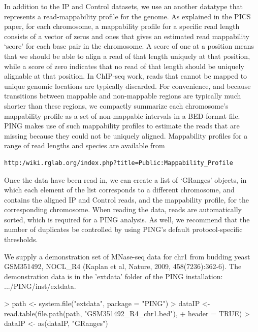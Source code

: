 \documentclass[11pt]{article}
\begin{document}
In addition to the IP and Control datasets, we use an another datatype that represents a read-mappability profile for the genome. 
As explained in the PICS paper, for each chromosome, a mappability profile for a specific read length consists of a vector of zeros and ones that gives an estimated read mappability `score' for each base pair in the chromosome. A score of one at a position means that we should be able to align a read of that length uniquely at that position, while a score of zero indicates that no read of that length should be uniquely alignable at that position. In ChIP-seq work, reads that cannot be mapped to unique genomic locations are typically discarded. For convenience, and because transitions between mappable and non-mappable regions are typically much shorter than these regions, we compactly summarize each chromosome's mappability profile as a set of 
non-mappable intervals in a BED-format file. 
PING makes use of such mappability profiles to estimate the reads that are missing because they could not be uniquely aligned. 
Mappability profiles for a range of read lengths and species are available from \begin{verbatim}
http:/wiki.rglab.org/index.php?title=Public:Mappability_Profile
\end{verbatim}


Once the data have been read in, we can create a list of `GRanges' objects, in which each element of the list corresponds to a different chromosome, and contains the aligned IP and Control reads, and the mappability profile, for the corresponding chromosome. When reading the data, reads are automatically sorted, which is required for a PING analysis. As well, we recommend that the number of duplicates be controlled by using PING's default protocol-specific thresholds.

We supply a demonstration set of MNase-seq data for chr1 from budding yeast GSM351492, NOCL\_R4 (Kaplan et al, Nature, 2009, 458(7236):362-6). The demonstration data is in the 'extdata' folder of the PING installation:  .../PING/inst/extdata.
\begin{Schunk}
\begin{Sinput}
> path <- system.file("extdata", package = "PING")
> dataIP <- read.table(file.path(path, "GSM351492_R4_chr1.bed"), 
+     header = TRUE)
> dataIP <- as(dataIP, "GRanges")
\end{Sinput}
\end{Schunk}
\end{document}
